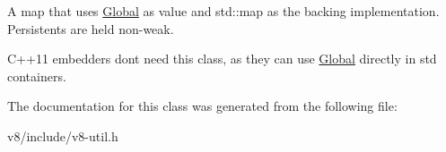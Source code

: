 A map that uses \mbox{\hyperlink{classv8_1_1Global}{Global}} as value and std\+::map as the backing implementation. Persistents are held non-\/weak.

C++11 embedders don\textquotesingle{}t need this class, as they can use \mbox{\hyperlink{classv8_1_1Global}{Global}} directly in std containers. 

The documentation for this class was generated from the following file\+:\begin{DoxyCompactItemize}
\item 
v8/include/v8-\/util.\+h\end{DoxyCompactItemize}
